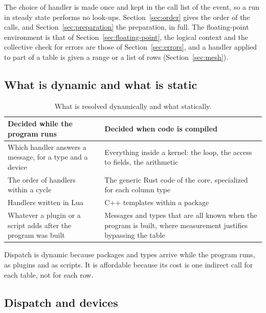 \documentclass[11pt,a4paper]{article}
\begin{document}
The choice of handler is made once and kept in the call list of the event,
so a run in steady state performs no look-ups.  Section~\ref{sec:order}
gives the order of the calls, and Section~\ref{sec:preparation} the
preparation, in full.  The floating-point
environment is that of Section~\ref{sec:floating-point}, the logical
context and the collective check for errors are those of
Section~\ref{sec:errors}, and a handler applied to part of a table is given
a range or a list of rows (Section~\ref{sec:mesh}).

\subsection{What is dynamic and what is static}

\begin{table}[ht]
\centering
\small
\begin{tabularx}{\textwidth}{@{}L L@{}}
\toprule
Decided while the program runs & Decided when code is compiled \\
\midrule
Which handler answers a message, for a type and a device & Everything inside a kernel: the loop, the access to fields, the arithmetic \\
The order of handlers within a cycle & The generic Rust code of the core, specialized for each column type \\
Handlers written in Lua & C++ templates within a package \\
Whatever a plugin or a script adds after the program was built & Messages and types that are all known when the program is built, where measurement justifies bypassing the table \\
\bottomrule
\end{tabularx}
\caption{What is resolved dynamically and what statically.}
\label{tab:static-dynamic}
\end{table}

Dispatch is dynamic because packages and types arrive while the program
runs, as plugins and as scripts.  It is affordable because its cost is one
indirect call for each table, not for each row.

\subsection{Dispatch and devices}
\label{sec:dispatch-devices}
\end{document}

